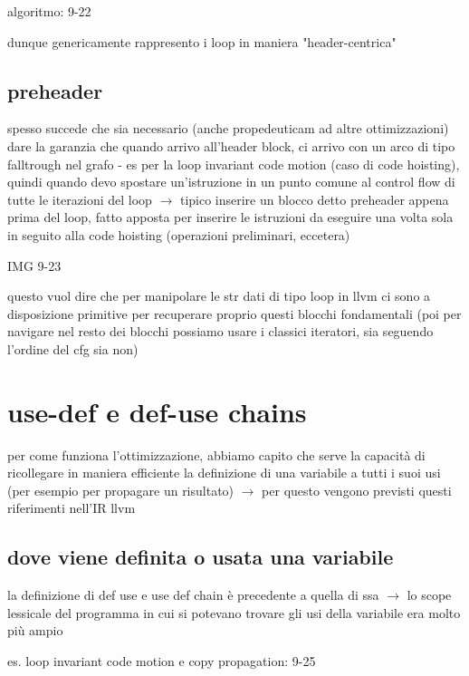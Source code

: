 algoritmo: 9-22

dunque genericamente rappresento i loop in maniera "header-centrica"

\subsection{preheader}

spesso succede che sia necessario (anche propedeuticam ad altre ottimizzazioni) dare la garanzia che quando arrivo all'header block, ci arrivo con un arco di tipo falltrough nel grafo - es per la loop invariant code motion (caso di code hoisting), quindi quando devo spostare un'istruzione in un punto comune al control flow di tutte le iterazioni del loop $\rightarrow$ tipico inserire un blocco detto preheader appena prima del loop, fatto apposta per inserire le istruzioni da eseguire una volta sola in seguito alla code hoisting (operazioni preliminari, eccetera)

IMG 9-23

\begin{emphasize}
  questo vuol dire che per manipolare le str dati di tipo loop in llvm ci sono a disposizione primitive per recuperare proprio questi blocchi fondamentali (poi per navigare nel resto dei blocchi possiamo usare i classici iteratori, sia seguendo l'ordine del cfg sia non)
\end{emphasize}

\section{use-def e def-use chains}

per come funziona l'ottimizzazione, abbiamo capito che serve la capacit\`a di ricollegare in maniera efficiente la definizione di una variabile a tutti i suoi usi (per esempio per propagare un risultato) $\rightarrow$ per questo vengono previsti questi riferimenti nell'IR llvm

\subsection{dove viene definita o usata una variabile}

la definizione di def use e use def chain \`e precedente a quella di ssa $\rightarrow$ lo scope lessicale del programma in cui si potevano trovare gli usi della variabile era molto pi\`u ampio

es. loop invariant code motion e copy propagation: 9-25

